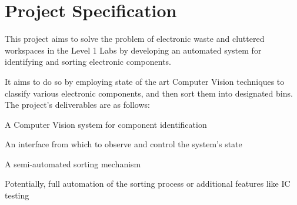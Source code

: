 \section{Project Specification}
This project aims to solve the problem of electronic waste and cluttered workspaces in the Level 1 Labs
by developing an automated system for identifying and sorting electronic components.

It aims to do so by employing state of the art Computer Vision techniques to classify various electronic components,
and then sort them into designated bins. The project's deliverables are as follows:
\begin{mylist}
  \item A Computer Vision system for component identification
  \item An interface from which to observe and control the system's state
  \item A semi-automated sorting mechanism
  \item Potentially, full automation of the sorting process or additional features like IC testing
\end{mylist}